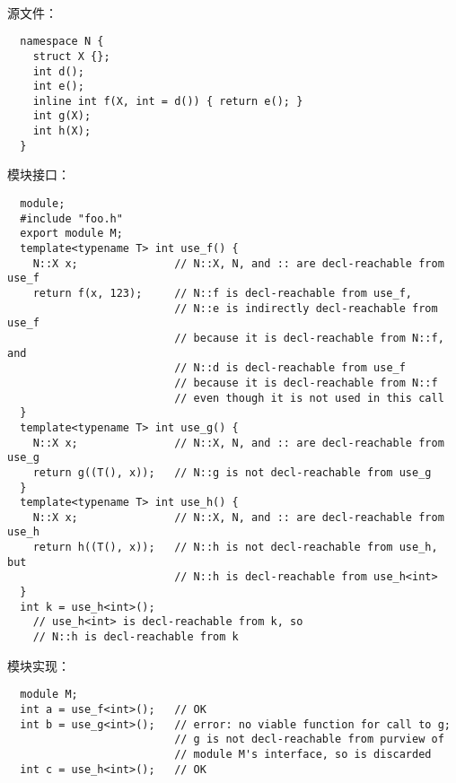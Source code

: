 \paragraph{} %
\begin{example}

  源文件：
  \begin{lstlisting}
  namespace N {
    struct X {};
    int d();
    int e();
    inline int f(X, int = d()) { return e(); }
    int g(X);
    int h(X);
  }
  \end{lstlisting}
  模块接口：
  \begin{lstlisting}
  module;
  #include "foo.h"
  export module M;
  template<typename T> int use_f() {
    N::X x;               // N::X, N, and :: are decl-reachable from use_f
    return f(x, 123);     // N::f is decl-reachable from use_f,
                          // N::e is indirectly decl-reachable from use_f
                          // because it is decl-reachable from N::f, and
                          // N::d is decl-reachable from use_f
                          // because it is decl-reachable from N::f
                          // even though it is not used in this call
  }
  template<typename T> int use_g() {
    N::X x;               // N::X, N, and :: are decl-reachable from use_g
    return g((T(), x));   // N::g is not decl-reachable from use_g
  }
  template<typename T> int use_h() {
    N::X x;               // N::X, N, and :: are decl-reachable from use_h
    return h((T(), x));   // N::h is not decl-reachable from use_h, but
                          // N::h is decl-reachable from use_h<int>
  }
  int k = use_h<int>();
    // use_h<int> is decl-reachable from k, so
    // N::h is decl-reachable from k
  \end{lstlisting}
  模块实现：
  \begin{lstlisting}
  module M;
  int a = use_f<int>();   // OK
  int b = use_g<int>();   // error: no viable function for call to g;
                          // g is not decl-reachable from purview of
                          // module M's interface, so is discarded
  int c = use_h<int>();   // OK
  \end{lstlisting}
\end{example}
